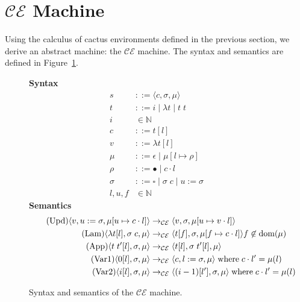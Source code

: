 \section{$\mathcal{CE}$ Machine} \label{sec:mach}

Using the calculus of cactus environments defined in the previous section, we
derive an abstract machine: the $\mathcal{CE}$ machine. The syntax
and semantics are defined in Figure~\ref{fig:CEM}. 

\begin{figure}
\textbf{Syntax}
\begin{align*}
\tag{State} s &::= \langle c, \sigma, \mu \rangle \\
\tag{Term} t &::= i \; | \; \lambda t \; | \; t \; t  \\
\tag{Variable} i &\in \mathbb{N}  \\
\tag{Closure} c &::= t [l] \\
\tag{Value} v &::= \lambda t[l] \\
\tag{Heap} \mu &::= \epsilon \; | \; \mu [ l \mapsto \rho ] \\
\tag{Environment} \rho &::= \bullet \; | \; c \cdot l \\
\tag{Context} \sigma &::= \square \; | \; \sigma \; c \;  | \; u:=\sigma \\
\tag{Location} l,u,f &\in \mathbb{N}
\end{align*}
\textbf{Semantics}
\begin{align*}
\tag{Upd}
\langle v, u := \sigma, \mu[u \mapsto c \cdot l] \rangle 
  &\rightarrow_{\mathcal{CE}}
\langle v, \sigma, \mu[u \mapsto v \cdot l] \rangle  \\
\tag{Lam}
\langle \lambda t[l], \sigma \; c, \mu \rangle 
  &\rightarrow_{\mathcal{CE}}
\langle t[f], \sigma, \mu[f \mapsto c \cdot l]\rangle f \not \in \textnormal{dom}(\mu)  \\
\tag{App}
\langle t \; t'[l], \sigma, \mu \rangle
  &\rightarrow_{\mathcal{CE}}
\langle t[l], \sigma \; t'[l], \mu \rangle \\
\tag{Var1}
\langle 0[l], \sigma, \mu \rangle
  &\rightarrow_{\mathcal{CE}}
\langle c, l := \sigma, \mu \rangle 
\; \textnormal{where} \; c \cdot l' = \mu(l)\\
\tag{Var2}
\langle i[l], \sigma, \mu \rangle
  &\rightarrow_{\mathcal{CE}}
\langle (i-1)[l'], \sigma, \mu \rangle
\; \textnormal{where} \; c \cdot l' = \mu(l)
\end{align*}
\caption{Syntax and semantics of the $\mathcal{CE}$ machine.}
\label{fig:CEM}
\end{figure}

